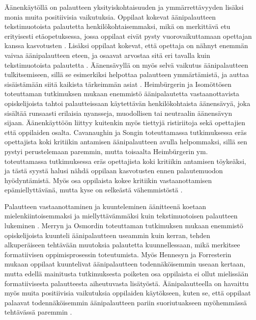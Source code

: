 \documentclass[utf8]{gradu3}
\begin{document}
Äänenkäytöllä on palautteen yksityiskohtaisuuden ja ymmärrettävyyden lisäksi monia muita positiivisia vaikutuksia. Oppilaat kokevat äänipalautteen tekstimuotoista palautetta henkilökohtaisemmaksi, mikä on merkittävä etu erityisesti etäopetuksessa, jossa oppilaat eivät pysty vuorovaikuttamaan opettajan kanssa kasvotusten \parencite{using, distanceLearning}. Lisäksi oppilaat kokevat, että opettaja on nähnyt enemmän vaivaa äänipalautteen eteen, ja osaavat arvostaa sitä eri tavalla kuin tekstimuotoista palautetta \parencite{listenOrToRead}. Äänensävyllä on myös selvä vaikutus äänipalautteen tulkitsemiseen, sillä se esimerkiksi helpottaa palautteen ymmärtämistä, ja auttaa sisäistämään siitä kaikista tärkeimmän asiat \parencite{attitudes}. Heimbürgerin ja Isomöttösen \parencite*{moderating} toteuttaman tutkimuksen mukaan enemmistö äänipalautetta vastaanottavista opiskelijoista tahtoi palautteissaan käytettävän henkilökohtaista äänensävyä, joka sisältää runsaasti erilaisia nyansseja, muodollisen tai neutraalin äänensävyn sijaan. Äänenkäyttöön liittyy kuitenkin myös tiettyjä ristiriitoja sekä opettajien että oppilaiden osalta. Cavanaughin ja Songin \parencite{versus} toteuttamassa tutkimuksessa eräs opettajista koki kritiikin antamisen äänipalautteen avulla helpommaksi, sillä sen pystyi perustelemaan paremmin, mutta toisaalta Heimbürgerin ym. \parencite*{academics} toteuttamassa tutkimuksessa eräs opettajista koki kritiikin antamisen töykeäksi, ja tästä syystä halusi nähdä oppilaan kasvotusten ennen palautemuodon hyödyntämistä. Myös osa oppilaista kokee kritiikin vastaanottamisen epämiellyttävänä, mutta kyse on selkeästä vähemmistöstä \parencite{voice}. 

Palautteen vastaanottaminen ja kuunteleminen äänitteenä koetaan mielenkiintoisemmaksi ja miellyttävämmäksi kuin tekstimuotoisen palautteen lukeminen \parencite{listenOrToRead}. Merryn ja Osmordin \parencite*{attitudes} toteuttaman tutkimuksen mukaan enemmistö opiskelijoista kuunteli äänipalautteen useammin kuin kerran, tehden alkuperäiseen tehtävään muutoksia palautetta kuunnellessaan, mikä merkitsee formatiivisen oppimisprosessin toteutumista. Myös Hennesyn ja Forresterin \parencite*{attitudes} mukaan oppilaat kuuntelivat äänipalautteen todennäköisemmin useaan kertaan, mutta edellä mainitusta tutkimuksesta poiketen osa oppilaista ei ollut mielissään formatiivisesta palautteesta aiheutuvasta lisätyöstä. Äänipalautteella on havaittu myös muita positiivisia vaikutuksia oppilaiden käytökseen, kuten se, että oppilaat palaavat todennäköisemmin äänipalautteen pariin suoriutuakseen myöhemmässä tehtävässä paremmin \parencite{voice}.
\end{document}
